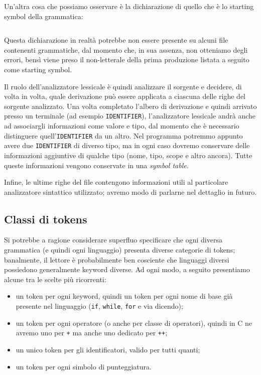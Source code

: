 \documentclass[class=book, crop=false, oneside, 12pt]{standalone}
\begin{document}
Un'altra cosa che possiamo osservare è la dichiarazione di quello che è lo starting symbol della grammatica:

\inputminted[firstline = 14, lastline = 14, linenos, breaklines, tabsize = 2]{c}{assets/resources/c99.y}

Questa dichiarazione in realtà potrebbe non essere presente su alcuni file contenenti grammatiche, dal momento che, in sua assenza, non otteniamo degli errori, bensì viene preso il non-letterale della prima produzione listata a seguito come starting symbol.


Il ruolo dell’analizzatore lessicale è quindi analizzare il sorgente e decidere, di volta in volta, quale derivazione può essere applicata a ciascuna delle righe del sorgente analizzato. Una volta completato l'albero di derivazione e quindi arrivato presso un terminale (ad esempio \texttt{IDENTIFIER}), l'analizzatore lessicale andrà anche ad associargli informazioni come valore e tipo, dal momento che è necessario distinguere quell'\texttt{IDENTIFIER} da un altro. Nel programma potremmo appunto avere due \texttt{IDENTIFIER} di diverso tipo, ma in ogni caso dovremo conservare delle informazioni aggiuntive di qualche tipo (nome, tipo, scope e altro ancora). Tutte queste informazioni vengono conservate in una \emph{symbol table}.

Infine, le ultime righe del file contengono informazioni utili al particolare analizzatore sintattico utilizzato; avremo modo di parlarne nel dettaglio in futuro.

\subsection{Classi di tokens}
Si potrebbe a ragione considerare superfluo specificare che ogni diversa grammatica (e quindi ogni linguaggio) presenta diverse categorie di tokens; banalmente, il lettore è probabilmente ben cosciente che linguaggi diversi possiedono generalmente keyword diverse. Ad ogni modo, a seguito presentiamo alcune tra le scelte più ricorrenti:
\begin{itemize}
    \item un token per ogni keyword, quindi un token per ogni nome di base già presente nel linguaggio (\texttt{if}, \texttt{while}, \texttt{for} e via dicendo);
    \item un token per ogni operatore (o anche per classe di operatori), quindi in C ne avremo uno per \texttt{+} ma anche uno dedicato per \texttt{++}; 
    \item un unico token per gli identificatori, valido per tutti quanti;
    \item un token per ogni simbolo di punteggiatura. 
\end{itemize}
\end{document}
